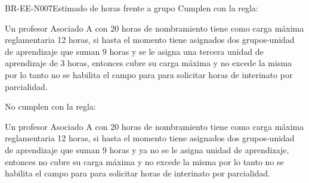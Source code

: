 \begin{BusinessRule}{BR-EE-N007}{Estimado de horas frente a grupo}
		 Cumplen con la regla: \\
			\begin{Titemize}
				\Titem Un profesor Asociado A con 20 horas de nombramiento tiene como carga máxima reglamentaria 12 horas, si hasta el momento tiene asignados dos grupos-unidad de aprendizaje que suman 9 horas y se le asigna una tercera unidad de aprendizaje de 3 horas, entonces cubre su carga máxima y no excede la misma por lo tanto no se habilita el campo para para solicitar horas de interinato por parcialidad.
			\end{Titemize}
		 No cumplen con la regla: \\
			\begin{Titemize}
				\Titem Un profesor Asociado A con 20 horas de nombramiento tiene como carga máxima reglamentaria 12 horas, si hasta el momento tiene asignados dos grupos-unidad de aprendizaje que suman 9 horas y ya no se le asigna unidad de aprendizaje, entonces no cubre su carga máxima y no excede la misma por lo tanto no se habilita el campo para para solicitar horas de interinato por parcialidad.
			\end{Titemize}
\end{BusinessRule}

